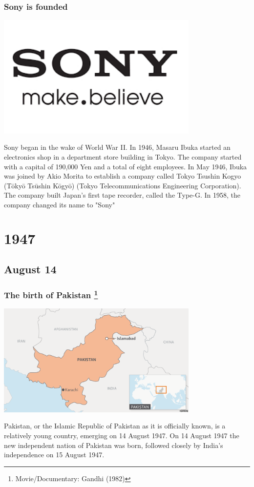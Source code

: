 \documentclass[11pt]{report}
\begin{document}
\subsection{Sony is founded}
\vspace{2mm}\begin{center}\includegraphics[width=10cm]{./img/sonylogo.png}\end{center}
Sony began in the wake of World War II. In 1946, Masaru Ibuka started an electronics shop in a department store building in Tokyo. The company started with a capital of 190,000 Yen and a total of eight employees. In May 1946, Ibuka was joined by Akio Morita to establish a company called Tokyo Tsushin Kogyo (Tōkyō Tsūshin Kōgyō) (Tokyo Telecommunications Engineering Corporation). The company built Japan's first tape recorder, called the Type-G. In 1958, the company changed its name to "Sony"

\chapter{1947}
\section{August 14}
\subsection{The birth of Pakistan \protect\footnote{Movie/Documentary: Gandhi (1982)}}
\vspace{2mm}\begin{center}\includegraphics[width=10cm]{./img/pakistan.png}\end{center}
Pakistan, or the Islamic Republic of Pakistan as it is officially known, is a relatively young country, emerging on 14 August 1947. On 14 August 1947 the new independent nation of Pakistan was born, followed closely by India's independence on 15 August 1947.
\end{document}
